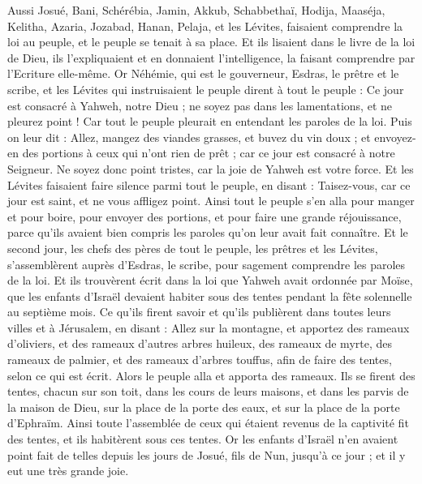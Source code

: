 \begin{multicols}{2}
Aussi Josué, Bani, Schérébia, Jamin, Akkub, Schabbethaï, Hodija, Maaséja, Kelitha, Azaria, Jozabad, Hanan, Pelaja, et les Lévites, faisaient comprendre la loi au peuple, et le peuple se tenait à sa place.
Et ils lisaient dans le livre de la loi de Dieu, ils l'expliquaient et en donnaient l'intelligence, la faisant comprendre par l'Ecriture elle-même.
Or Néhémie, qui est le gouverneur, Esdras, le prêtre et le scribe, et les Lévites qui instruisaient le peuple dirent à tout le peuple : Ce jour est consacré à Yahweh, notre Dieu ; ne soyez pas dans les lamentations, et ne pleurez point ! Car tout le peuple pleurait en entendant les paroles de la loi.
Puis on leur dit : Allez, mangez des viandes grasses, et buvez du vin doux ; et envoyez-en des portions à ceux qui n'ont rien de prêt ; car ce jour est consacré à notre Seigneur. Ne soyez donc point tristes, car la joie de Yahweh est votre force.
Et les Lévites faisaient faire silence parmi tout le peuple, en disant : Taisez-vous, car ce jour est saint, et ne vous affligez point.
Ainsi tout le peuple s'en alla pour manger et pour boire, pour envoyer des portions, et pour faire une grande réjouissance, parce qu'ils avaient bien compris les paroles qu'on leur avait fait connaître.
Et le second jour, les chefs des pères de tout le peuple, les prêtres et les Lévites, s'assemblèrent auprès d'Esdras, le scribe, pour sagement comprendre les paroles de la loi.
Et ils trouvèrent écrit dans la loi que Yahweh avait ordonnée par Moïse, que les enfants d'Israël devaient habiter sous des tentes pendant la fête solennelle au septième mois.
Ce qu'ils firent savoir et qu'ils publièrent dans toutes leurs villes et à Jérusalem, en disant : Allez sur la montagne, et apportez des rameaux d'oliviers, et des rameaux d'autres arbres huileux, des rameaux de myrte, des rameaux de palmier, et des rameaux d'arbres touffus, afin de faire des tentes, selon ce qui est écrit.
Alors le peuple alla et apporta des rameaux. Ils se firent des tentes, chacun sur son toit, dans les cours de leurs maisons, et dans les parvis de la maison de Dieu, sur la place de la porte des eaux, et sur la place de la porte d'Ephraïm.
Ainsi toute l'assemblée de ceux qui étaient revenus de la captivité fit des tentes, et ils habitèrent sous ces tentes. Or les enfants d'Israël n'en avaient point fait de telles depuis les jours de Josué, fils de Nun, jusqu'à ce jour ; et il y eut une très grande joie.

\end{multicols}
